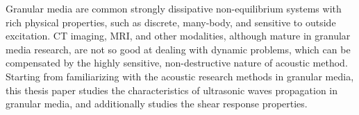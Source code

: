 %

\begin{digest}

    Granular media are common strongly dissipative non-equilibrium systems with rich physical properties, such as discrete, many-body, and sensitive to outside excitation.
    CT imaging, MRI, and other modalities, although mature in granular media research, are not so good at dealing with dynamic problems, which can be compensated by the highly sensitive, non-destructive nature of acoustic method.
    Starting from familiarizing with the acoustic research methods in granular media, this thesis paper studies the characteristics of ultrasonic waves propagation in granular media, and additionally studies the shear response properties.



\end{digest}

